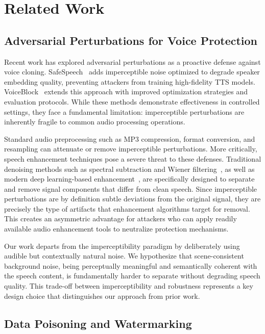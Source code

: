\section{Related Work}

\subsection{Adversarial Perturbations for Voice Protection}

Recent work has explored adversarial perturbations as a proactive defense against voice cloning. SafeSpeech~\citep{safespeech} adds imperceptible noise optimized to degrade speaker embedding quality, preventing attackers from training high-fidelity TTS models. VoiceBlock~\citep{voiceblock} extends this approach with improved optimization strategies and evaluation protocols. While these methods demonstrate effectiveness in controlled settings, they face a fundamental limitation: imperceptible perturbations are inherently fragile to common audio processing operations.

Standard audio preprocessing such as MP3 compression, format conversion, and resampling can attenuate or remove imperceptible perturbations. More critically, speech enhancement techniques pose a severe threat to these defenses. Traditional denoising methods such as spectral subtraction and Wiener filtering~\citep{denoising}, as well as modern deep learning-based enhancement~\citep{demucs}, are specifically designed to separate and remove signal components that differ from clean speech. Since imperceptible perturbations are by definition subtle deviations from the original signal, they are precisely the type of artifacts that enhancement algorithms target for removal. This creates an asymmetric advantage for attackers who can apply readily available audio enhancement tools to neutralize protection mechanisms.

Our work departs from the imperceptibility paradigm by deliberately using audible but contextually natural noise. We hypothesize that scene-consistent background noise, being perceptually meaningful and semantically coherent with the speech content, is fundamentally harder to separate without degrading speech quality. This trade-off between imperceptibility and robustness represents a key design choice that distinguishes our approach from prior work.

\subsection{Data Poisoning and Watermarking}

